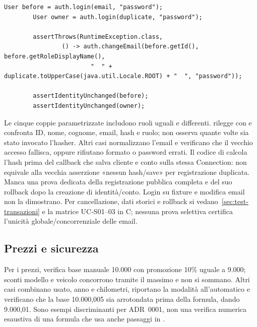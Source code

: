 \noindent\begin{minipage}{\linewidth}
\begin{lstlisting}[firstnumber=61,caption={Email duplicata: rifiuto e conservazione delle due identità (PostgreSQL).},label=lst:test-auth]
        User before = auth.login(email, "password");
        User owner = auth.login(duplicate, "password");

        assertThrows(RuntimeException.class,
                () -> auth.changeEmail(before.getId(), before.getRoleDisplayName(),
                        "  " + duplicate.toUpperCase(java.util.Locale.ROOT) + "  ", "password"));

        assertIdentityUnchanged(before);
        assertIdentityUnchanged(owner);
\end{lstlisting}
\end{minipage}


Le cinque coppie parametrizzate includono ruoli uguali e differenti.
 rilegge con  e confronta ID,
nome, cognome, email, hash e ruolo; non osserva quante volte sia stato
invocato l'hasher. Altri casi normalizzano l'email e verificano che il
vecchio accesso fallisca, oppure rifiutano formato o password errati.
Il codice di  calcola l'hash prima del callback che
salva cliente e conto sulla stessa Connection: non equivale alla vecchia
asserzione «nessun hash/save» per registrazione duplicata.
Manca una prova dedicata della registrazione pubblica completa e del suo
rollback dopo la creazione di identità/conto. Login su fixture e modifica
email non la dimostrano. Per cancellazione, dati storici e rollback si
vedano~\ref{sec:test-transazioni} e la matrice UC-S01--03 in C; nessuna
prova selettiva certifica l'unicità globale/concorrenziale delle email.

\subsection{Prezzi e sicurezza}\label{sec:test-prezzi}
Per i prezzi,  verifica base manuale
10.000 con promozione 10\% uguale a 9.000; sconti modello e veicolo
concorrono tramite il massimo e non si sommano. Altri casi combinano usato,
anno e chilometri, riportano la modalità all'automatico e verificano che
la base 10.000,005 sia arrotondata prima della formula, dando 9.000,01.
Sono esempi discriminanti per ADR~0001, non una verifica numerica esaustiva
di una formula che usa anche passaggi in .

